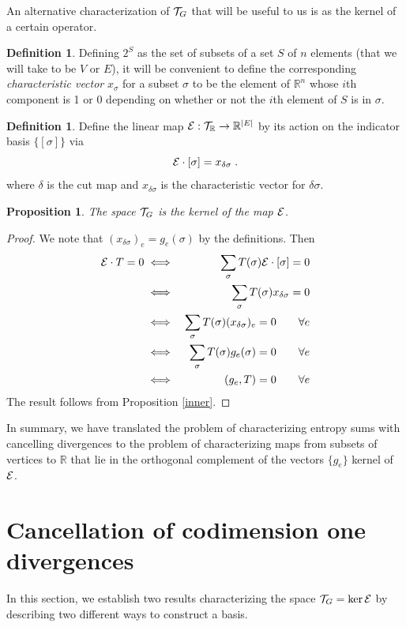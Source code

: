 \documentclass[12pt]{article}
\newtheorem{proposition}[theorem]{Proposition}
\theoremstyle{definition}
\newtheorem{definition}[theorem]{Definition}
\begin{document}
An alternative characterization of ${\cal T}_G$ that will be useful to us is as the kernel of a certain operator.
\begin{definition}
Defining $2^S$ as the set of subsets of a set $S$ of $n$ elements (that we will take to be $V$ or $E$), it will be convenient to define the corresponding {\it characteristic vector} $x_\sigma$ for a subset $\sigma$ to be the element of $\mathbb{R}^n$ whose $i$th component is 1 or 0 depending on whether or not the $i$th element of $S$ is in $\sigma$.
\end{definition}

\begin{definition}
Define the linear map ${\cal E}:{\cal T}_{\mathbb{R}} \to \mathbb{R}^{|E|}$ by its action on the indicator basis $\{[\sigma]\}$ via
\[
{\cal E} \cdot [\sigma] = x_{\delta \sigma} \; .
\]
where $\delta$ is the cut map and $x_{\delta \sigma}$ is the characteristic vector for $\delta \sigma$. 
\end{definition}

\begin{proposition}
The space ${\cal T}_G$ is the kernel of the map ${\cal E}$.
\end{proposition}
\begin{proof}
    We note that $(x_{\delta \sigma})_e = g_e(\sigma)$ by the definitions. Then
    \begin{eqnarray*}
        {\cal E} \cdot T = 0 
        &\iff& \sum_\sigma T(\sigma) {\cal E} \cdot [\sigma] = 0 \cr
        &\iff& \sum_\sigma T(\sigma) x_{\delta \sigma} = 0 \cr
        &\iff& \sum_\sigma T(\sigma) (x_{\delta \sigma})_e = 0 \qquad \forall e \cr
        &\iff& \sum_\sigma T(\sigma) g_e(\sigma) = 0 \qquad \forall e \cr
        &\iff& (g_e, T) = 0 \qquad \forall e \cr
    \end{eqnarray*}
    The result follows from Proposition \ref{inner}.
\end{proof}
In summary, we have translated the problem of characterizing entropy sums with cancelling divergences to the problem of characterizing maps from subsets of vertices to $\mathbb{R}$ that lie in the orthogonal complement of the vectors $\{g_e\}$ kernel of ${\cal E}$. 

\section{Cancellation of codimension one divergences}

In this section, we establish two results characterizing the space ${\cal T}_G = \ker {\cal E}$ by describing two different ways to construct a basis. 
\end{document}

